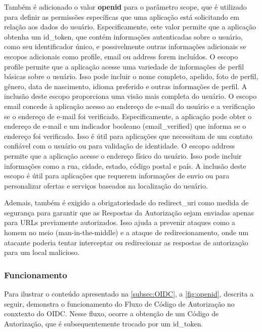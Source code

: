 Também é adicionado o valor \textbf{openid} para o parâmetro scope, que é utilizado para definir as permissões específicas que uma aplicação está solicitando em relação aos dados do usuário. Especificamente, este valor permite que a aplicação obtenha um id\_token, que contém informações autenticadas sobre o usuário, como seu identificador único, e possivelmente outras informações adicionais se escopos adicionais como profile, email ou address forem incluídos. O escopo profile permite que a aplicação acesse uma variedade de informações de perfil básicas sobre o usuário. Isso pode incluir o nome completo, apelido, foto de perfil, gênero, data de nascimento, idioma preferido e outras informações de perfil. A inclusão deste escopo proporciona uma visão mais completa do usuário. O escopo email concede à aplicação acesso ao endereço de e-mail do usuário e a verificação se o endereço de e-mail foi verificado. Especificamente, a aplicação pode obter o endereço de e-mail e um indicador booleano (email\_verified) que informa se o endereço foi verificado. Isso é útil para aplicações que necessitam de um contato confiável com o usuário ou para validação de identidade. O escopo address permite que a aplicação acesse o endereço físico do usuário. Isso pode incluir informações como a rua, cidade, estado, código postal e país. A inclusão deste escopo é útil para aplicações que requerem informações de envio ou para personalizar ofertas e serviços baseados na localização do usuário.

Ademais, também é exigido a obrigatoriedade do redirect\_uri como medida de segurança para garantir que as Respostas da Autorização sejam enviadas apenas para URLs previamente autorizados. Isso ajuda a prevenir ataques como a homem no meio (man-in-the-middle) e a ataque de redirecionamento, onde um atacante poderia tentar interceptar ou redirecionar as respostas de autorização para um local malicioso. 

\subsubsection{Funcionamento}\label{subsubsec:funcionamento-oidc}

Para ilustrar o conteúdo apresentado na \autoref{subsec:OIDC}, a  \autoref{fig:openid}, descrita a seguir, demonstra o funcionamento do Fluxo de Código de Autorização no conxtexto do \acs{OIDC}. Nesse fluxo, ocorre a obtenção de um Código de Autorização, que é subsequentemente trocado por um id\_token.



